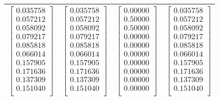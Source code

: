\documentclass[11pt]{article}
\begin{document}
\begin{table}[!h]
\begin{tabular}{|c|c|c|c|}
$\begin{bmatrix}
   0.035758\\
   0.057212\\
   0.058092\\
   0.079217\\
   0.085818\\
   0.066014\\
   0.157905\\
   0.171636\\
   0.137309\\
   0.151040\\
         \end{bmatrix}$
  &
  $\begin{bmatrix}
     0.035758\\
   0.057212\\
   0.058092\\
   0.079217\\
   0.085818\\
   0.066014\\
   0.157905\\
   0.171636\\
   0.137309\\
   0.151040\\
    \end{bmatrix}$
  &
  $\begin{bmatrix}
     0.00000\\
   0.50000\\
   0.50000\\
   0.00000\\
   0.00000\\
   0.00000\\
   0.00000\\
   0.00000\\
   0.00000\\
   0.00000\\
     \end{bmatrix}$
 &	 
  $\begin{bmatrix}
   0.035758\\
   0.057212\\
   0.058092\\
   0.079217\\
   0.085818\\
   0.066014\\
   0.157905\\
   0.171636\\
   0.137309\\
   0.151040\\
     \end{bmatrix}$\\
      \hline
    \end{tabular}
\end{table}
\end{document}
